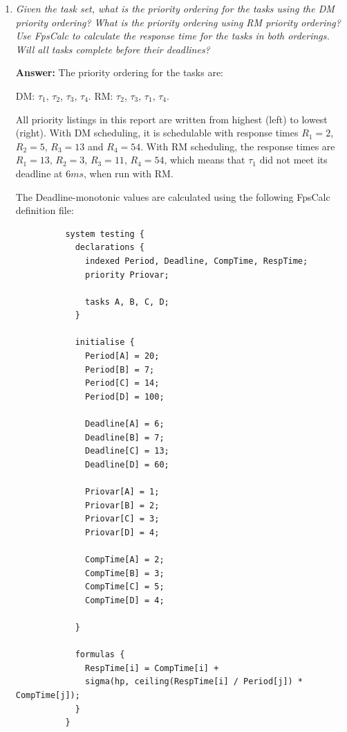 \documentclass[a4paper,10pt]{article}
\newcommand{\answer}{\textbf{Answer: }}
\begin{document}
\begin{enumerate}
	\item \emph{Given the task set, what is the priority ordering for the tasks using the DM priority ordering? What is the priority ordering using RM priority ordering? Use FpsCalc to calculate the response time for the tasks in both orderings. Will all tasks complete before their deadlines?}
	
	\answer The priority ordering for the tasks are:
	
	DM: $\tau_1$, $\tau_2$, $\tau_3$, $\tau_4$.
	RM: $\tau_2$, $\tau_3$, $\tau_1$, $\tau_4$.
	
	All priority listings in this report are written from highest (left) to lowest (right). With DM scheduling, it is schedulable with response times $R_1 = 2$, $R_2 = 5$, $R_3 = 13$ and $R_4 = 54$. With RM scheduling, the response times are $R_1 = 13$, $R_2 = 3$, $R_3 = 11$, $R_4 = 54$, which means that $\tau_1$ did not meet its deadline at $6ms$, when run with RM.
	
	The Deadline-monotonic values are calculated using the following FpsCalc definition file:

        \begin{lstlisting}
          system testing {
            declarations {		
              indexed Period, Deadline, CompTime, RespTime;
              priority Priovar;	
              
              tasks A, B, C, D;
            }
            
            initialise {
              Period[A] = 20;
              Period[B] = 7;
              Period[C] = 14;
              Period[D] = 100;
              
              Deadline[A] = 6;
              Deadline[B] = 7;
              Deadline[C] = 13;
              Deadline[D] = 60;
              
              Priovar[A] = 1;
              Priovar[B] = 2;
              Priovar[C] = 3;
              Priovar[D] = 4;
              
              CompTime[A] = 2;
              CompTime[B] = 3;
              CompTime[C] = 5;
              CompTime[D] = 4;
              
            }
            
            formulas {
              RespTime[i] = CompTime[i] +
              sigma(hp, ceiling(RespTime[i] / Period[j]) * CompTime[j]);
            }
          }
        \end{lstlisting}
        

\end{enumerate}
\end{document}
